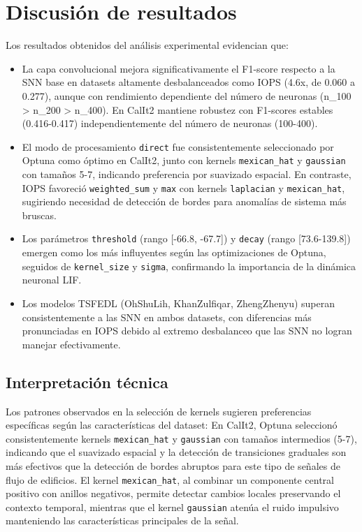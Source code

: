 \section{Discusión de resultados}
Los resultados obtenidos del análisis experimental evidencian que:
\begin{itemize}
    \item La capa convolucional mejora significativamente el F1-score respecto a la SNN base en datasets altamente desbalanceados como IOPS (4.6x, de 0.060 a 0.277), aunque con rendimiento dependiente del número de neuronas (n\_100 > n\_200 > n\_400). En CalIt2 mantiene robustez con F1-scores estables (0.416-0.417) independientemente del número de neuronas (100-400).
    \item El modo de procesamiento \texttt{direct} fue consistentemente seleccionado por Optuna como óptimo en CalIt2, junto con kernels \texttt{mexican\_hat} y \texttt{gaussian} con tamaños 5-7, indicando preferencia por suavizado espacial. En contraste, IOPS favoreció \texttt{weighted\_sum} y \texttt{max} con kernels \texttt{laplacian} y \texttt{mexican\_hat}, sugiriendo necesidad de detección de bordes para anomalías de sistema más bruscas.
    \item Los parámetros \texttt{threshold} (rango [-66.8, -67.7]) y \texttt{decay} (rango [73.6-139.8]) emergen como los más influyentes según las optimizaciones de Optuna, seguidos de \texttt{kernel\_size} y \texttt{sigma}, confirmando la importancia de la dinámica neuronal LIF.
    \item Los modelos TSFEDL (OhShuLih, KhanZulfiqar, ZhengZhenyu) superan consistentemente a las SNN en ambos datasets, con diferencias más pronunciadas en IOPS debido al extremo desbalanceo que las SNN no logran manejar efectivamente.
\end{itemize}

\subsection{Interpretación técnica}
Los patrones observados en la selección de kernels sugieren preferencias específicas según las características del dataset:
En CalIt2, Optuna seleccionó consistentemente kernels \texttt{mexican\_hat} y \texttt{gaussian} con tamaños intermedios (5-7), indicando que el suavizado espacial y la detección de transiciones graduales son más efectivos que la detección de bordes abruptos para este tipo de señales de flujo de edificios. El kernel \texttt{mexican\_hat}, al combinar un componente central positivo con anillos negativos, permite detectar cambios locales preservando el contexto temporal, mientras que el kernel \texttt{gaussian} atenúa el ruido impulsivo manteniendo las características principales de la señal.

